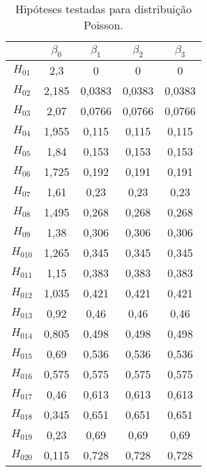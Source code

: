 \begin{table}[H]
\centering
\begin{tabular}{ccccc}
\hline
          & $\beta_0$ & $\beta_1$ & $\beta_2$ & $\beta_3$ \\ \hline
$H_{01}$  & 2,3       & 0         & 0         & 0         \\
$H_{02}$  & 2,185     & 0,0383    & 0,0383    & 0,0383    \\
$H_{03}$  & 2,07      & 0,0766    & 0,0766    & 0,0766    \\
$H_{04}$  & 1,955     & 0,115     & 0,115     & 0,115     \\
$H_{05}$  & 1,84      & 0,153     & 0,153     & 0,153     \\
$H_{06}$  & 1,725     & 0,192     & 0,191     & 0,191     \\
$H_{07}$  & 1,61      & 0,23      & 0,23      & 0,23      \\
$H_{08}$  & 1,495     & 0,268     & 0,268     & 0,268     \\
$H_{09}$  & 1,38      & 0,306     & 0,306     & 0,306     \\
$H_{010}$ & 1,265     & 0,345     & 0,345     & 0,345     \\
$H_{011}$ & 1,15      & 0,383     & 0,383     & 0,383     \\
$H_{012}$ & 1,035     & 0,421     & 0,421     & 0,421     \\
$H_{013}$ & 0,92      & 0,46      & 0,46      & 0,46      \\
$H_{014}$ & 0,805     & 0,498     & 0,498     & 0,498     \\
$H_{015}$ & 0,69      & 0,536     & 0,536     & 0,536     \\
$H_{016}$ & 0,575     & 0,575     & 0,575     & 0,575     \\
$H_{017}$ & 0,46      & 0,613     & 0,613     & 0,613     \\
$H_{018}$ & 0,345     & 0,651     & 0,651     & 0,651     \\
$H_{019}$ & 0,23      & 0,69      & 0,69      & 0,69      \\
$H_{020}$ & 0,115     & 0,728     & 0,728     & 0,728     \\ \hline
\end{tabular}
\caption{Hipóteses testadas para distribuição Poisson.}
\label{tab:th_poisson}
\end{table}


